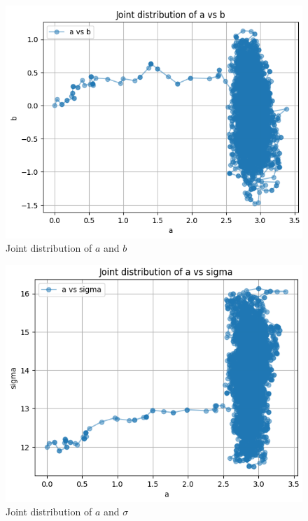 \begin{figure}[htbp]
    \centering
    \includegraphics[width=\linewidth]{plots/output_multivar_4.png}
    \caption{Joint distribution of \(a\) and \(b\)}
    \label{fig:my_label}
\end{figure}

\begin{figure}[htbp]
    \centering
    \includegraphics[width=\linewidth]{plots/output_multivar_5.png}
    \caption{Joint distribution of \(a\) and \(\sigma\)}
    \label{fig:my_label}
\end{figure}

